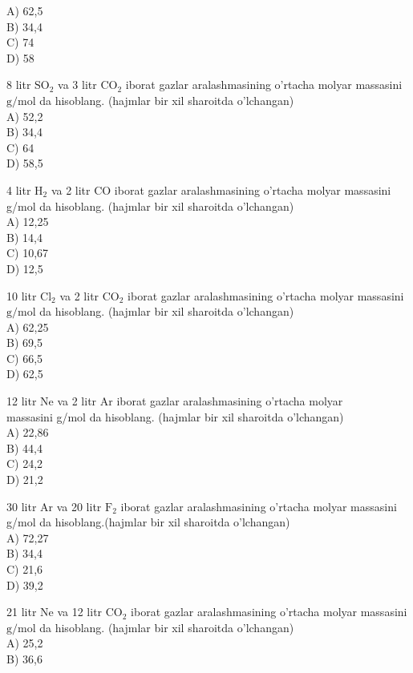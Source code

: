 A) 62,5\\
B) 34,4\\
C) 74\\
D) 58
  \item 8 litr $\mathrm{SO}_{2}$ va 3 litr $\mathrm{CO}_{2}$ iborat gazlar aralashmasining o'rtacha molyar massasini $\mathrm{g} / \mathrm{mol}$ da hisoblang. (hajmlar bir xil sharoitda o'lchangan)\\
A) 52,2\\
B) 34,4\\
C) 64\\
D) 58,5
  \item 4 litr $\mathrm{H}_{2}$ va 2 litr CO iborat gazlar aralashmasining o'rtacha molyar massasini g/mol da hisoblang. (hajmlar bir xil sharoitda o'lchangan)\\
A) 12,25\\
B) 14,4\\
C) 10,67\\
D) 12,5
  \item 10 litr $\mathrm{Cl}_{2}$ va 2 litr $\mathrm{CO}_{2}$ iborat gazlar aralashmasining o'rtacha molyar massasini $\mathrm{g} / \mathrm{mol}$ da hisoblang. (hajmlar bir xil sharoitda o'lchangan)\\
A) 62,25\\
B) 69,5\\
C) 66,5\\
D) 62,5
  \item 12 litr Ne va 2 litr Ar iborat gazlar aralashmasining o'rtacha molyar\\
massasini g/mol da hisoblang. (hajmlar bir xil sharoitda o'lchangan)\\
A) 22,86\\
B) 44,4\\
C) 24,2\\
D) 21,2
  \item 30 litr Ar va 20 litr $\mathrm{F}_{2}$ iborat gazlar aralashmasining o'rtacha molyar massasini g/mol da hisoblang.(hajmlar bir xil sharoitda o'lchangan)\\
A) 72,27\\
B) 34,4\\
C) 21,6\\
D) 39,2
  \item 21 litr Ne va 12 litr $\mathrm{CO}_{2}$ iborat gazlar aralashmasining o'rtacha molyar massasini $\mathrm{g} / \mathrm{mol}$ da hisoblang. (hajmlar bir xil sharoitda o'lchangan)\\
A) 25,2\\
B) 36,6\\
